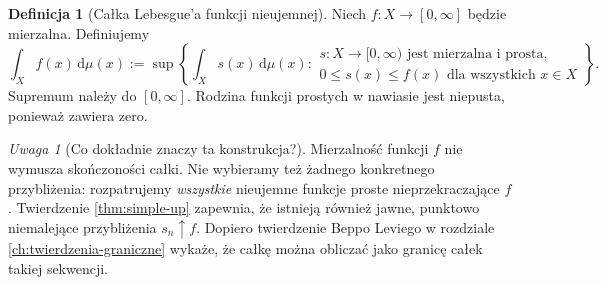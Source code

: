 \documentclass[11pt,a4paper,oneside]{book}
\numberwithin{equation}{chapter}
\theoremstyle{plain}
\theoremstyle{definition}
\newtheorem{definicja}[twierdzenie]{Definicja}
\theoremstyle{remark}
\newtheorem{uwaga}[twierdzenie]{Uwaga}
\begin{document}
\begin{definicja}[Całka Lebesgue'a funkcji nieujemnej]
\label{def:integral-positive}
Niech $f:X\to[0,\infty]$ będzie mierzalna. Definiujemy
\begin{equation}\label{eq:positive-integral}
\int_X f(x)\,\mathrm d\mu(x)
:=\sup\left\{\int_X s(x)\,\mathrm d\mu(x):
\begin{array}{l}
 s:X\to[0,\infty)\text{ jest mierzalna i prosta},\\[-2pt]
 0\le s(x)\le f(x)\text{ dla wszystkich }x\in X
\end{array}\right\}.
\end{equation}
Supremum należy do $[0,\infty]$. Rodzina funkcji
prostych w nawiasie jest niepusta, ponieważ zawiera zero.
\end{definicja}

\begin{uwaga}[Co dokładnie znaczy ta konstrukcja?]
Mierzalność funkcji $f$ nie wymusza skończoności całki.
Nie wybieramy też żadnego konkretnego przybliżenia:
rozpatrujemy \emph{wszystkie} nieujemne funkcje proste
nieprzekraczające $f$. Twierdzenie
\ref{thm:simple-up} zapewnia, że istnieją również
jawne, punktowo niemalejące przybliżenia $s_n\uparrow f$.
Dopiero twierdzenie Beppo Leviego w rozdziale
\ref{ch:twierdzenia-graniczne} wykaże, że całkę można
obliczać jako granicę całek takiej sekwencji.
\end{uwaga}
\end{document}
